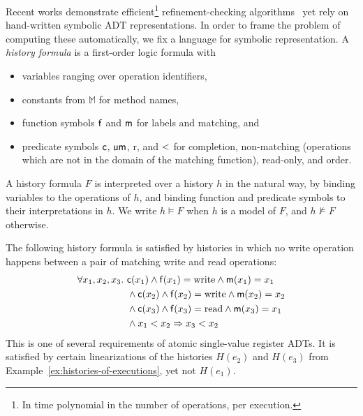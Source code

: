 Recent works demonstrate efficient\footnote{In time polynomial in the number of
operations, per execution.} refinement-checking
algorithms~\cite{conf/popl/BouajjaniEEH15, conf/pldi/EmmiEH15} yet rely on
hand-written symbolic ADT representations. In order to frame the problem of
computing these automatically, we fix a language for symbolic representation. A
\emph{history formula} is a first-order logic formula with
\begin{itemize}

  \item variables ranging over operation identifiers,

  \item constants from $\mathbb{M}$ for method names,

  \item function symbols ${\sf f}$ and ${\sf m}$ for labels and matching, and

  \item predicate symbols ${\sf c}$, ${\sf um}$, {\sf r}, and ${\sf <}$ for completion,
  non-matching (operations which are not in the domain of the matching function), read-only, and order.

\end{itemize}
A history formula $F$ is interpreted over a history $h$ in the natural way, by
binding variables to the operations of $h$, and binding function and predicate
symbols to their interpretations in $h$. We write $h \models F$ when $h$ is a
model of $F$, and $h \not\models F$ otherwise.

\begin{example}

  The following history formula is satisfied by histories in which no write
  operation happens between a pair of matching write and read operations:
  \begin{align*}
    \forall x_1, x_2, x_3.\
    & {\sf c}(x_1) \land {\sf f}(x_1) = \mathrm{write} \land {\sf m}(x_1) = x_1 \\
    & \land {\sf c}(x_2) \land {\sf f}(x_2) = \mathrm{write} \land {\sf m}(x_2) = x_2 \\
    & \land {\sf c}(x_3) \land {\sf f}(x_3) = \mathrm{read} \land {\sf m}(x_3) = x_1 \\
    & \land x_1 < x_2
      \implies x_3 < x_2
  \end{align*}
  This is one of several requirements of atomic single-value register ADTs.
  It is satisfied by certain linearizations of the histories $H(e_2)$ and
  $H(e_3)$ from Example~\ref{ex:histories-of-executions}, yet not $H(e_1)$.

\end{example}

